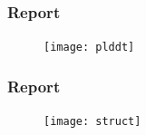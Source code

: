 \documentclass[10pt]{beamer}
\begin{document}
\begin{frame}
\frametitle{Report}
\begin{figure}[H]
\begin{center}
\texttt{[image: plddt]}
\end{center}
\end{figure}
\end{frame}

\begin{frame}
\frametitle{Report}
\begin{figure}[H]
\begin{center}
\texttt{[image: struct]}
\end{center}
\end{figure}
\end{frame}
\end{document}
